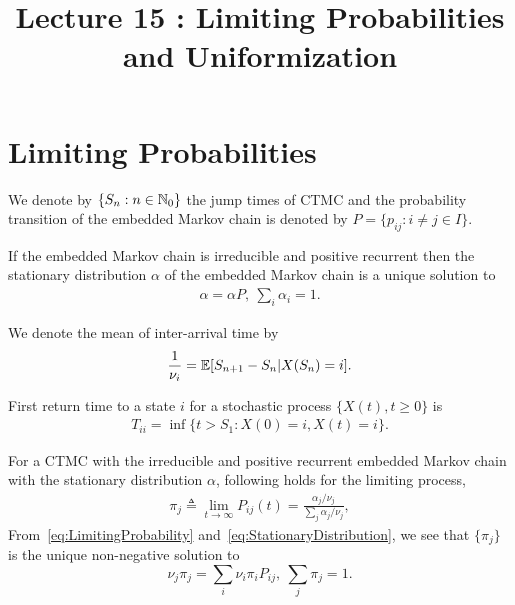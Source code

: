 \documentclass[a4paper,10pt,english]{article}
\title{Lecture 15 : Limiting Probabilities and Uniformization }%
\author{}
\begin{document}
\maketitle

\section{Limiting Probabilities}
We denote by $\{S_n: n \in \mathbb{N}_0\}$ the jump times of CTMC and the probability transition of the embedded Markov chain is denoted by $P = \{p_{ij}: i \neq j \in I\}$. 
\begin{defn}
If the embedded Markov chain is irreducible and positive recurrent then the stationary distribution $\alpha$ of the embedded Markov chain is a unique solution to
\begin{align}
\label{eq:StationaryDistribution}
\alpha = \alpha P,~ \sum_{i}\alpha_i = 1.
\end{align}
\end{defn}
We denote the mean of inter-arrival time by 
\begin{align*}
\frac{1}{\nu_i} = \mathbb{E}[S_{n+1} - S_{n}|X(S_n) = i].
\end{align*} 
\begin{defn} First return time to a state $i$ for a stochastic process $\{X(t), t \geqslant 0\}$ is 
\begin{align*}
T_{ii} = \inf\{t > S_1 : X(0) = i, X(t) = i\}.
\end{align*}
\end{defn}
\begin{thm} For a CTMC with the irreducible and positive recurrent embedded Markov chain with the stationary distribution $\alpha$, following holds for the limiting process,
\begin{align}
\label{eq:LimitingProbability}
 \pi_j \triangleq \lim_{t \rightarrow \infty } P_{ij}(t)= \frac{\alpha_j / \nu_j}{\sum_j \alpha_j /\nu_j},
\end{align}
From~\eqref{eq:LimitingProbability} and~\eqref{eq:StationaryDistribution}, we see that $\{\pi_j\}$ is the unique non-negative solution to 
\begin{equation}
\nu_j\pi_j=\sum_i \nu_i\pi_iP_{ij},~ \sum_j \pi_j =1.
\end{equation}
\end{thm}
\end{document}
